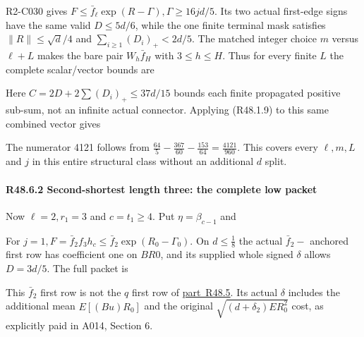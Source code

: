 R2-C030 gives \(F\le \bar f_\ell \exp(R-\Gamma),\allowbreak \allowbreak  \Gamma\ge 16j d/5\). Its two actual first-edge signs have the same valid \(D\le 5d/6\), while the one finite terminal mask satisfies \(\lVert R\rVert \le \sqrt{d}/4\) and \(\sum_{i\ge 1}(D_i)_+<2d/5\). The matched integer choice \(m\) versus \(\ell+L\) makes the bare pair \(W_h \bar f_H\) with \(3\le h\le H\). Thus for every finite \(L\) the complete scalar/vector bounds are


Here \(C=2D+2 \sum(D_i)_+\le 37d/15\) bounds each finite propagated positive sub-sum, not an infinite actual connector. Applying (R48.1.9) to this same combined vector gives


The numerator 4121 follows from \(\frac{64}{5}-\frac{367}{60}-\frac{153}{64}=\frac{4121}{960}\). This covers every \(\ell,\allowbreak \allowbreak  m,\allowbreak \allowbreak  L\) and \(j\) in this entire structural class without an additional \(d\) split.

\paragraph{R48.6.2 Second-shortest length three: the complete low packet}

Now \(\ell=2,\allowbreak \allowbreak  r_1=3\) and \(c=t_{1}\ge 4\). Put \(\eta=\beta_{c-1}\) and


For \(j=1,\allowbreak \allowbreak  F=\bar f_{2} f_{3} h_c\le \bar f_{2} \exp(R_0-\Gamma_{0})\). On \(d\le \frac{1}{8}\) the actual \(\bar f_{2}-\) anchored first row has coefficient one on \(BR0\), and its supplied whole signed \(\delta\) allows \(D=3d/5\). The full packet is


This \(\bar f_{2}\) first row is not the \(q\) first row of \mbox{\hyperref[part:R48.5]{part R48.5}}. Its actual \(\delta\) includes the additional mean \(E[(Bu)R_0]\) and the original \(\sqrt{(d+\delta_2) E R_0^2}\) cost, as explicitly paid in A014, Section 6.

